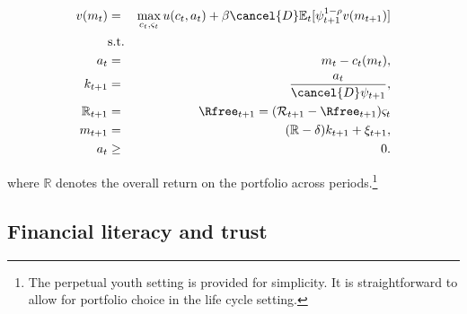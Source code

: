 \documentclass[\econtexRoot/Chp1proposal]{subfiles}
\begin{document}
\begin{eqnarray*}
  v(m_t) &=& \max_{c_t, \varsigma_t} u(c_t, a_t) + \beta \cancel{D} \mathbb{E}_{t}[\psi_{t+1}^{1-\rho}v(m_{t+1})] \\
  &\text{s.t.}& \\
  a_t &=& m_t - c_t(m_t), \\
  k_{t+1} &=& \frac{a_t}{\cancel{D}\psi_{t+1}}, \\
  \mathbb{R}_{t+1} &=& \Rfree_{t+1} = (\mathcal{R}_{t+1} - \Rfree_{t+1})\varsigma_t \\
  m_{t+1} &=& (\mathbb{R} - \delta)k_{t+1} + \xi_{t+1}, \\
  a_t &\geq& 0.
\end{eqnarray*}

\par where $\mathbb{R}$ denotes the overall return on the portfolio across periods.\footnote{The perpetual youth setting is provided for simplicity. It is straightforward to allow for portfolio choice in the life cycle setting.}




\subsection{Financial literacy and trust}

\cite{Deuflhard2018} \cite{Lusardi2014}

\cite{lgpslz2008} \cite{jbpglg2016}

\onlyinsubfile{}

\end{document}
